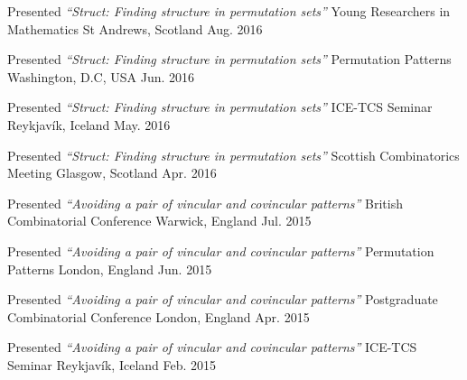 \begin{cventries}
\cventrypresentation
  {Presented \textit{``Struct: Finding structure in permutation sets''}} %
  {Young Researchers in Mathematics} %
  {St Andrews, Scotland} %
  {Aug. 2016} %


\cventrypresentation
  {Presented \textit{``Struct: Finding structure in permutation sets''}} %
  {Permutation Patterns} %
  {Washington, D.C, USA} %
  {Jun. 2016} %


\cventrypresentation
  {Presented \textit{``Struct: Finding structure in permutation sets''}} %
  {ICE-TCS Seminar} %
  {Reykjavík, Iceland} %
  {May. 2016} %


\cventrypresentation
  {Presented \textit{``Struct: Finding structure in permutation sets''}} %
  {Scottish Combinatorics Meeting} %
  {Glasgow, Scotland} %
  {Apr. 2016} %


\cventrypresentation
  {Presented \textit{``Avoiding a pair of vincular and covincular patterns''}} %
  {British Combinatorial Conference} %
  {Warwick, England} %
  {Jul. 2015} %


\cventrypresentation
  {Presented \textit{``Avoiding a pair of vincular and covincular patterns''}} %
  {Permutation Patterns} %
  {London, England} %
  {Jun. 2015} %


\cventrypresentation
  {Presented \textit{``Avoiding a pair of vincular and covincular patterns''}} %
  {Postgraduate Combinatorial Conference} %
  {London, England} %
  {Apr. 2015} %


\cventrypresentation
  {Presented \textit{``Avoiding a pair of vincular and covincular patterns''}} %
  {ICE-TCS Seminar} %
  {Reykjavík, Iceland} %
  {Feb. 2015} %



\end{cventries}
